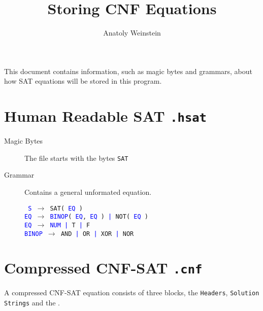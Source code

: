 \documentclass[12pt, letterpaper]{article}
\title{Storing CNF Equations}
\author{Anatoly Weinstein}
\begin{document}
    \maketitle

    This document contains information, such as magic bytes
	and grammars, about how SAT equations will be stored in
	this program.

    \section{Human Readable SAT \texttt{.hsat}}

    \begin{description}
		\item[Magic Bytes]

        The file starts with the bytes \texttt{SAT}

        \item[Grammar]

		Contains a general unformated equation.

		\texttt {
			\textcolor{blue}{S} $\rightarrow$ SAT\string( \textcolor{blue}{EQ} \string) \\
			\textcolor{blue}{EQ} $\rightarrow$ \textcolor{blue}{BINOP}{\string(} \textcolor{blue}{EQ}{,} \textcolor{blue}{EQ} {\string)} \textcolor{blue}{|} {NOT\string(} \textcolor{blue}{EQ} {\string)} \\
			\textcolor{blue}{EQ} $\rightarrow$ \textcolor{blue}{NUM} \textcolor{blue}{|} {T} \textcolor{blue}{|} {F} \\
			\textcolor{blue}{BINOP} $\rightarrow$ {AND} \textcolor{blue}{|} {OR} \textcolor{blue}{|} {XOR} \textcolor{blue}{|} {NOR} \\
		}

    \end{description}

    \section{Compressed CNF-SAT \texttt{.cnf}}

	A compressed CNF-SAT equation consists of three blocks,
	the \texttt{Headers}, \texttt{Solution Strings} and the
	.
\end{document}
